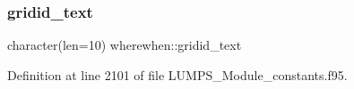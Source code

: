 \mbox{\label{namespacewherewhen_a68eaceec6f42308af79f51f3c7cc76db}} 
\subsubsection{\texorpdfstring{gridid\+\_\+text}{gridid\_text}}
{\footnotesize\ttfamily character(len=10) wherewhen\+::gridid\+\_\+text}



Definition at line 2101 of file L\+U\+M\+P\+S\+\_\+\+Module\+\_\+constants.\+f95.

